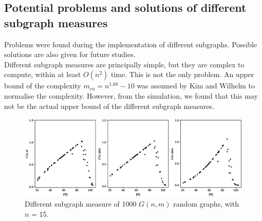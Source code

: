 \documentclass[12pt]{article}
\begin{document}
\subsection{Potential problems and solutions of different subgraph measures}
\label{problem}
Problems were found during the implementation of different subgraphs. Possible solutions are also given for future studies.\\
Different subgraph measures are principally simple, but they are complex to compute, within at least $O(n^2)$ time\cite{KIM20082637}. This is not the only problem. An upper bound of the complexity $m_{cu} = n^{1.68}-10$ was assumed by Kim and Wilhelm\cite{KIM20082637} to normalise the complexity. However, from the simulation, we found that this may not be the actual upper bound of the different subgraph measures.

\begin{figure}[ht]
    \includegraphics[width=\textwidth]{subgraph_measures.eps}
    \caption{Different subgraph measure of 1000 $G(n,m)$ random graphs, with $n$ = 15.}
    \label{fig:subgraph_measure}
\end{figure}
\end{document}
